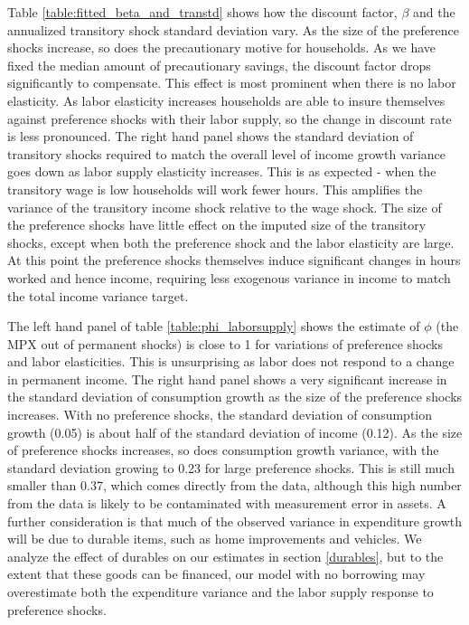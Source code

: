 \documentclass[titlepage]{\econtex}\newcommand{\texname}{ConsumptionHeterogeneity}
\begin{document}
Table \ref{table:fitted_beta_and_transtd} shows how the discount factor, $\beta$ and the annualized transitory shock standard deviation vary. As the size of the preference shocks increase, so does the precautionary motive for households. As we have fixed the median amount of precautionary savings, the discount factor drops significantly to compensate. This effect is most prominent when there is no labor elasticity. As labor elasticity increases households are able to insure themselves against preference shocks with their labor supply, so the change in discount rate is less pronounced. The right hand panel shows the standard deviation of transitory shocks required to match the overall level of income growth variance goes down as labor supply elasticity increases. This is as expected - when the transitory wage is low households will work fewer hours. This amplifies the variance of the transitory income shock relative to the wage shock. The size of the preference shocks have little effect on the imputed size of the transitory shocks, except when both the preference shock and the labor elasticity are large. At this point the preference shocks themselves induce significant changes in hours worked and hence income, requiring less exogenous variance in income to match the total income variance target.

The left hand panel of table \ref{table:phi_laborsupply} shows the estimate of $\phi$ (the MPX out of permanent shocks) is close to 1 for variations of preference shocks and labor elasticities. This is unsurprising as labor does not respond to a change in permanent income. The right hand panel shows a very significant increase in the standard deviation of consumption growth as the size of the preference shocks increases. With no preference shocks, the standard deviation of consumption growth (0.05) is about half of the standard deviation of income (0.12). As the size of preference shocks increases, so does consumption growth variance, with the standard deviation growing to 0.23 for large preference shocks. This is still much smaller than 0.37, which comes directly from the data, although this high number from the data is likely to be contaminated with measurement error in assets. A further consideration is that much of the observed variance in expenditure growth will be due to durable items, such as home improvements and vehicles. We analyze the effect of durables on our estimates in section \ref{durables}, but to the extent that these goods can be financed, our model with no borrowing may overestimate both the expenditure variance and the labor supply response to preference shocks.
\end{document}
